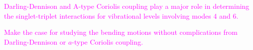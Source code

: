 \documentclass[12pt,draft]{mitthesis}
\newcommand{\POINT}[1]{\textcolor{magenta}{#1}}
\begin{document}
\POINT{Darling-Dennison and A-type Coriolis coupling play a major role
  in determining the singlet-triplet interactions for vibrational
  levels involving modes 4 and 6.}

\POINT{Make the case for studying the bending motions without
  complications from Darling-Dennison or $a$-type Coriolis coupling.}



\end{document}
